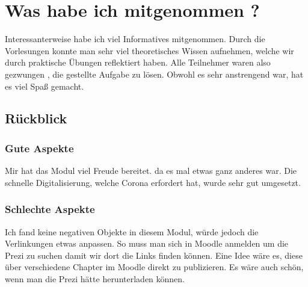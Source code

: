 \chapter{Was habe ich mitgenommen ? }

Interessanterweise habe ich viel Informatives mitgenommen. Durch die Vorlesungen konnte man sehr viel theoretisches Wissen aufnehmen, welche wir durch praktische Übungen reflektiert haben. Alle Teilnehmer waren also \dq gezwungen \dq , die gestellte Aufgabe zu lösen. Obwohl es sehr anstrengend war, hat es viel Spaß gemacht. 




\section{Rückblick}
\subsection{Gute Aspekte}
Mir hat das Modul viel Freude bereitet. da es mal etwas ganz anderes war. Die schnelle Digitalisierung, welche Corona erfordert hat, wurde sehr gut umgesetzt. 


\subsection{Schlechte Aspekte}
Ich fand keine negativen Objekte in diesem Modul, würde jedoch die Verlinkungen etwas anpassen. So muss man sich in Moodle anmelden um die Prezi zu suchen damit wir dort die Links finden können. Eine Idee wäre es, diese über verschiedene Chapter im Moodle direkt zu publizieren. Es wäre auch schön, wenn man die Prezi hätte herunterladen können.
